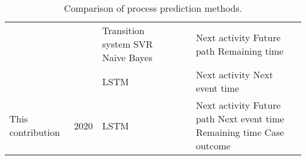 \begin{table}[]
\begin{tabularx}{\textwidth}{p{3.5cm} l p{3.2cm} p{1.1cm} p{1.1cm} p{3cm}}
		 \citeauthor{DBLP:journals/computing/PolatoSBL18} \cite{DBLP:journals/computing/PolatoSBL18}&  \citeyear{DBLP:journals/computing/PolatoSBL18} &  Transition system \newline SVR \newline Naive Bayes &  \checkmark & \xmark & Next activity  \newline Future path \newline Remaining time \\
		 
		 \citeauthor{DBLP:conf/icpm/ParkS19} \cite{DBLP:conf/icpm/ParkS19} & \citeyear{DBLP:conf/icpm/ParkS19} & LSTM & \checkmark & \xmark &Next activity \newline Next event time  \\
		 
		 This contribution &  2020 &  LSTM & \checkmark & \checkmark &  Next activity \newline Future path \newline Next event time  \newline Remaining time \newline Case outcome 
	 	\\ \bottomrule
	\end{tabularx}
	\caption[Comparison  of process prediction methods]{Comparison  of process prediction methods.}
	\label{tab:preliminaries}
\end{table}